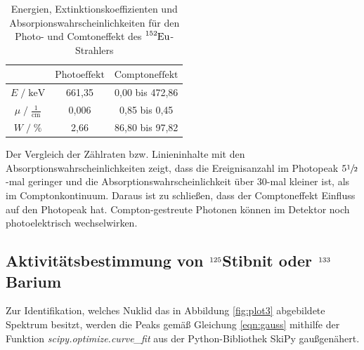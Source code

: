 \begin{table}
  \centering
  \caption{Energien, Extinktionskoeffizienten und Absorpionswahrscheinlichkeiten für den Photo- und Comtoneffekt des $\ce{^{152}Eu}$-Strahlers}
  \label{tab:mess3}
  \begin{tabular}{c c c }
  \toprule
  $ $ & $\text{Photoeffekt}$ & $\text{Comptoneffekt}$ \\
  \midrule
  $E \;/\; \si{\kilo\eV}$                 & 661,35 & 0,00 bis 472,86  \\
  $\mu \;/\; \frac{1}{\si{\centi\meter}}$ & 0,006  & 0,85 bis 0,45 \\
  $W \;/\; \si{\percent}$                 & 2,66   & 86,80 bis 97,82 \\
  \bottomrule
  \end{tabular}
\end{table}

Der Vergleich der Zählraten bzw. Linieninhalte mit den Absorptionswahrscheinlichkeiten zeigt, dass die Ereignisanzahl im Photopeak 
$5 \sfrac{1}{2}$-mal geringer und die Absorptionswahrscheinlichkeit über $30$-mal kleiner ist, als im Comptonkontinuum.
Daraus ist zu schließen, dass der Comptoneffekt Einfluss auf den Photopeak hat. Compton-gestreute Photonen können im 
Detektor noch photoelektrisch wechselwirken.


\subsection{Aktivitätsbestimmung von  $\ce{^{125}}$Stibnit oder  $\ce{^{133}}$Barium }

Zur Identifikation, welches Nuklid das in Abbildung \ref{fig:plot3} abgebildete Spektrum besitzt, werden die Peaks gemäß
Gleichung \eqref{eqn:gauss} mithilfe der Funktion \textit{scipy.optimize.curve\_fit} aus der Python-Bibliothek SkiPy
gaußgenähert.

